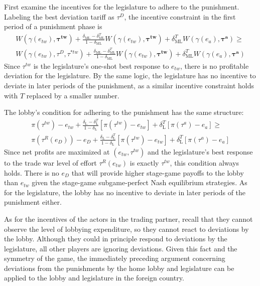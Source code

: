\documentclass[authoryear, review]{elsarticle}
\newcommand{\bta}{\bm{\tau^a}}
\newcommand{\ga}{\gamma}
\newcommand{\btw}{\bm{\tau^{tw}}}
\newcommand{\de}{\delta}
\begin{document}
First examine the incentives for the legislature to adhere to the punishment. Labeling the best deviation tariff as $\tau^D$, the incentive constraint in the first period of a punishment phase is 
  \begin{multline}
		W(\ga(e_{tw}),\btw) + \frac{\de_\text{ML} - \de_\text{ML}^{T}}{1-\de_\text{ML}}W(\ga(e_{tw}),\btw) + \de_\text{ML}^{T} W(\ga(e_a),\bta) \geq \\ W(\ga(e_{tw}),\tau^D,\tau^{*tw}) + \frac{\de_\text{ML} - \de_\text{ML}^{T}}{1-\de_\text{ML}}W(\ga(e_{tw}),\btw) + \de_\text{ML}^{T} W(\ga(e_a),\bta)
		\label{eq:legpun}
	\end{multline}
Since $\tau^{tw}$ is the legislature's one-shot best response to $e_{tw}$, there is no profitable deviation for the legislature. By the same logic, the legislature has no incentive to deviate in later periods of the punishment, as a similar incentive constraint holds with $T$ replaced by a smaller number.

The lobby's condition for adhering to the punishment has the same structure:
  \begin{multline}
	  \pi(\tau^{tw}) - e_{tw} + \frac{\de_\text{L} - \de_\text{L}^T}{1-\de_\text{L}} \left[\pi(\tau^{tw}) - e_{tw} \right] + \de_\text{L}^T \left[\pi(\tau^a) - e_a \right] \geq \\  \pi\left(\tau^R\left(e_D\right)\right) -e_D + \frac{\de_\text{L} - \de_\text{L}^T}{1-\de_\text{L}} \left[\pi(\tau^{tw}) - e_{tw} \right] + \de_\text{L}^T \left[\pi(\tau^a) - e_a \right]
		\label{eq:lobpun}
	\end{multline}
Since net profits are maximized at $\left(e_{tw},\tau^{tw}\right)$ and the legislature's best response to the trade war level of effort $\tau^R(e_{tw})$ is exactly $\tau^{tw}$, this condition always holds. There is no $e_D$ that will provide higher stage-game payoffs to the lobby than $e_{tw}$ given the stage-game subgame-perfect Nash equilibrium strategies. As for the legislature, the lobby has no incentive to deviate in later periods of the punishment either.

As for the incentives of the actors in the trading partner, recall that they cannot observe the level of lobbying expenditure, so they cannot react to deviations by the lobby. Although they could in principle respond to deviations by the legislature, all other players are ignoring deviations. Given this fact and the symmetry of the game, the immediately preceding argument concerning deviations from the punishments by the home lobby and legislature can be applied to the lobby and legislature in the foreign country.
\end{document}
